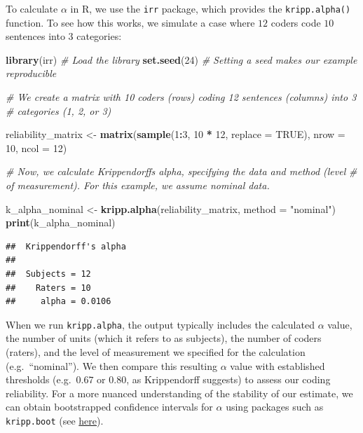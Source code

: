 \documentclass[
]{book}
\newenvironment{Shaded}{\begin{snugshade}}{\end{snugshade}}
\newcommand{\AttributeTok}[1]{\textcolor[rgb]{0.13,0.29,0.53}{#1}}
\newcommand{\CommentTok}[1]{\textcolor[rgb]{0.56,0.35,0.01}{\textit{#1}}}
\newcommand{\ConstantTok}[1]{\textcolor[rgb]{0.56,0.35,0.01}{#1}}
\newcommand{\DecValTok}[1]{\textcolor[rgb]{0.00,0.00,0.81}{#1}}
\newcommand{\FunctionTok}[1]{\textcolor[rgb]{0.13,0.29,0.53}{\textbf{#1}}}
\newcommand{\NormalTok}[1]{#1}
\newcommand{\OtherTok}[1]{\textcolor[rgb]{0.56,0.35,0.01}{#1}}
\newcommand{\SpecialCharTok}[1]{\textcolor[rgb]{0.81,0.36,0.00}{\textbf{#1}}}
\newcommand{\StringTok}[1]{\textcolor[rgb]{0.31,0.60,0.02}{#1}}
\begin{document}
To calculate \(\alpha\) in R, we use the \texttt{irr} package, which provides the \texttt{kripp.alpha()} function. To see how this works, we simulate a case where \(12\) coders code \(10\) sentences into \(3\) categories:

\begin{Shaded}
\begin{Highlighting}[]
\FunctionTok{library}\NormalTok{(irr)  }\CommentTok{\# Load the library}
\FunctionTok{set.seed}\NormalTok{(}\DecValTok{24}\NormalTok{)  }\CommentTok{\# Setting a seed makes our example reproducible}

\CommentTok{\# We create a matrix with 10 coders (rows) coding 12 sentences (columns) into 3}
\CommentTok{\# categories (1, 2, or 3)}

\NormalTok{reliability\_matrix }\OtherTok{\textless{}{-}} \FunctionTok{matrix}\NormalTok{(}\FunctionTok{sample}\NormalTok{(}\DecValTok{1}\SpecialCharTok{:}\DecValTok{3}\NormalTok{, }\DecValTok{10} \SpecialCharTok{*} \DecValTok{12}\NormalTok{, }\AttributeTok{replace =} \ConstantTok{TRUE}\NormalTok{), }\AttributeTok{nrow =} \DecValTok{10}\NormalTok{, }\AttributeTok{ncol =} \DecValTok{12}\NormalTok{)}

\CommentTok{\# Now, we calculate Krippendorff\textquotesingle{}s alpha, specifying the data and method (level}
\CommentTok{\# of measurement). For this example, we assume nominal data.}

\NormalTok{k\_alpha\_nominal }\OtherTok{\textless{}{-}} \FunctionTok{kripp.alpha}\NormalTok{(reliability\_matrix, }\AttributeTok{method =} \StringTok{"nominal"}\NormalTok{)}
\FunctionTok{print}\NormalTok{(k\_alpha\_nominal)}
\end{Highlighting}
\end{Shaded}

\begin{verbatim}
##  Krippendorff's alpha
## 
##  Subjects = 12 
##    Raters = 10 
##     alpha = 0.0106
\end{verbatim}

When we run \texttt{kripp.alpha}, the output typically includes the calculated \(\alpha\) value, the number of units (which it refers to as subjects), the number of coders (raters), and the level of measurement we specified for the calculation (e.g.~``nominal''). We then compare this resulting \(\alpha\) value with established thresholds (e.g.~\(0.67\) or \(0.80\), as Krippendorff suggests) to assess our coding reliability. For a more nuanced understanding of the stability of our estimate, we can obtain bootstrapped confidence intervals for \(\alpha\) using packages such as \texttt{kripp.boot} (see \href{https://github.com/MikeGruz/kripp.boot}{here}).
\end{document}
